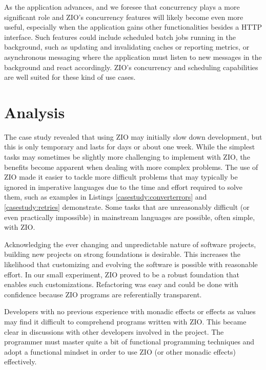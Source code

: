As the application advances, and we foresee that concurrency plays a more significant role and ZIO's concurrency features will likely become even more useful, especially when the application gains other functionalities besides a HTTP interface. Such features could include scheduled batch jobs running in the background, such as updating and invalidating caches or reporting metrics, or asynchronous messaging where the application must listen to new messages in the background and react accordingly. ZIO's concurrency and scheduling capabilities are well suited for these kind of use cases.


\section{Analysis}
The case study revealed that using ZIO may initially slow down development, but this is only temporary and lasts for days or about one week. While the simplest tasks may sometimes be slightly more challenging to implement with ZIO, the benefits become apparent when dealing with more complex problems. The use of ZIO made it easier to tackle more difficult problems that may typically be ignored in imperative languages due to the time and effort required to solve them, such as examples in Listings \ref{casestudy:converterrors} and \ref{casestudy:retries} demonstrate. Some tasks that are unreasonably difficult (or even practically impossible) in mainstream languages are possible, often simple, with ZIO.

Acknowledging the ever changing and unpredictable nature of software projects, building new projects on strong foundations is desirable. This increases the likelihood that customizing and evolving the software is possible with reasonable effort. In our small experiment, ZIO proved to be a robust foundation that enables such customizations. Refactoring was easy and could be done with confidence because ZIO programs are referentially transparent.

Developers with no previous experience with monadic effects or effects as values may find it difficult to comprehend programs written with ZIO. This became clear in discussions with other developers involved in the project. The programmer must master quite a bit of functional programming techniques and adopt a functional mindset in order to use ZIO (or other monadic effects) effectively.

